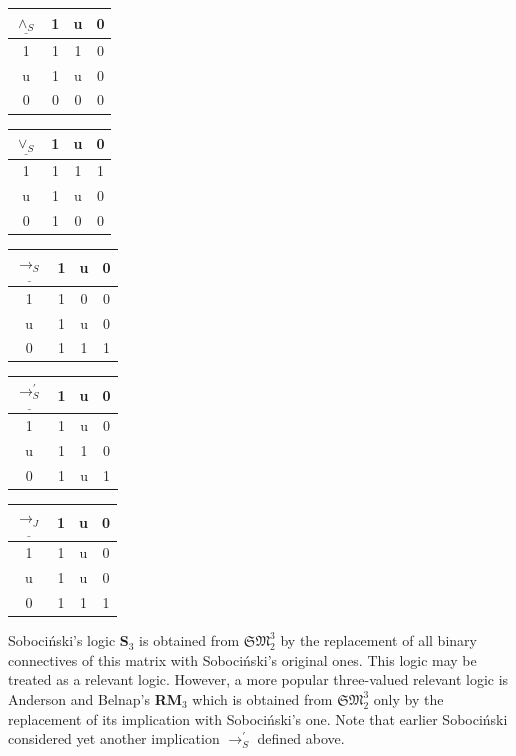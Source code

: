 \documentclass[11pt,a4paper,titlepage]{article}
\theoremstyle{definition}
\newcommand{\3}{\vspace{.3in}}
\newcommand{\2}{\vspace{.2in}}
\newcommand{\1}{\vspace{.1in}}
\newcommand{\5}{\vspace{.05in}}
\begin{document}
\begin{center}
	\begin{tabular}{|c|ccc|}
		\hline
		$\underline{\wedge_S} $ & 1 & u & 0 \\
		\hline
		1 & 1 & 1 & 0 \\
		u & 1 & u & 0 \\
		0 & 0 & 0 & 0 \\
		\hline
	\end{tabular}
	\begin{tabular}{|c|ccc|}
		\hline$\underline{\vee_S} $ & 1 & u & 0 \\\hline
		1 & 1 & 1 & 1 \\
		u & 1 & u & 0 \\
		0 & 1 & 0 & 0 \\\hline
	\end{tabular}
	\begin{tabular}{|c|ccc|}
		\hline
		$\underline{\rightarrow_S} $ & 1 & u & 0 \\
		\hline
		1 & 1 & 0 & 0 \\
		u & 1 & u & 0 \\
		0 & 1 & 1 & 1 \\
		\hline
	\end{tabular}
	\end{center} 
	\begin{center}
	\begin{tabular}{|c|ccc|}
		\hline
		$\underline{\rightarrow_S^\prime} $ & 1 & u & 0 \\
		\hline
		1 & 1 & u & 0 \\
		u & 1 & 1 & 0 \\
		0 & 1 & u & 1 \\
		\hline
	\end{tabular}
	\begin{tabular}{|c|ccc|}
		\hline$\underline{\rightarrow_J} $ & 1 & u & 0 \\\hline
		1 & 1 & u & 0 \\
		u & 1 & u & 0 \\
		0 & 1 & 1 & 1 \\\hline
	\end{tabular}
\end{center}

Soboci\'nski's logic {\bf S$_3$} is obtained from $\mathfrak{SM}_2^3$ by the replacement of all binary connectives of this matrix with Soboci\'nski's original ones. This logic may be treated as a relevant logic. However, a more popular three-valued relevant logic is Anderson and Belnap's {\bf RM$_3$} \cite{EntailmentI} which is obtained from $\mathfrak{SM}_2^3$ only by the replacement of its implication with Soboci\'nski's one. Note that earlier Soboci\'nski \cite{Sobocinski1} considered yet another implication $ \rightarrow_S^\prime $ defined above.
\end{document}
